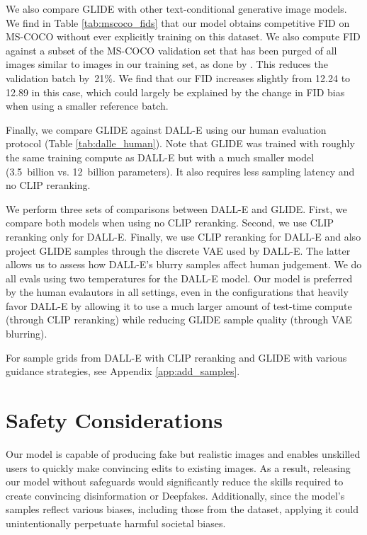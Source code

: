We also compare GLIDE with other text-conditional generative image models. We find in Table \ref{tab:mscoco_fids} that our model obtains competitive FID on MS-COCO without ever explicitly training on this dataset. We also compute FID against a subset of the MS-COCO validation set that has been purged of all images similar to images in our training set, as done by \citet{dalle}. This reduces the validation batch by~21\%. We find that our FID increases slightly from 12.24 to 12.89 in this case, which could largely be explained by the change in FID bias when using a smaller reference batch.

Finally, we compare GLIDE against DALL-E using our human evaluation protocol (Table \ref{tab:dalle_human}). Note that GLIDE was trained with roughly the same training compute as DALL-E but with a much smaller model (3.5~billion vs. 12~billion parameters). It also requires less sampling latency and no CLIP reranking. 

We perform three sets of comparisons between DALL-E and GLIDE. First, we compare both models when using no CLIP reranking. Second, we use CLIP reranking only for DALL-E. Finally, we use CLIP reranking for DALL-E and also project GLIDE samples through the discrete VAE used by DALL-E. The latter allows us to assess how DALL-E's blurry samples affect human judgement. We do all evals using two temperatures for the DALL-E model. Our model is preferred by the human evalautors in all settings, even in the configurations that heavily favor DALL-E by allowing it to use a much larger amount of test-time compute (through CLIP reranking) while reducing GLIDE sample quality (through VAE blurring).

For sample grids from DALL-E with CLIP reranking and GLIDE with various guidance strategies, see Appendix \ref{app:add_samples}. 

\section{Safety Considerations}
\label{safety_considerations}

Our model is capable of producing fake but realistic images and enables unskilled users to quickly make convincing edits to existing images. As a result, releasing our model without safeguards would significantly reduce the skills required to create convincing disinformation or Deepfakes. Additionally, since the model's samples reflect various biases, including those from the dataset, applying it could unintentionally perpetuate harmful societal biases.

